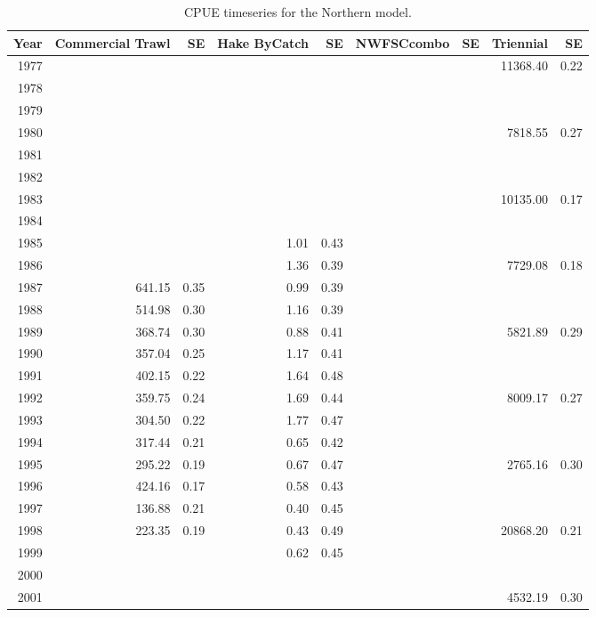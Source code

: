 \documentclass[12pt,]{article}
\begin{document}
\newpage

\begin{table}[ht]
\centering
\caption{CPUE timeseries for the Northern model.} 
\label{tab:Northern_CPUE}
\begin{tabular}{rrrrrrrrr}
  \hline
Year & Commercial Trawl & SE & Hake ByCatch & SE & NWFSCcombo & SE & Triennial & SE \\ 
  \hline
1977 &  &  &  &  &  &  & 11368.40 & 0.22 \\ 
  1978 &  &  &  &  &  &  &  &  \\ 
  1979 &  &  &  &  &  &  &  &  \\ 
  1980 &  &  &  &  &  &  & 7818.55 & 0.27 \\ 
  1981 &  &  &  &  &  &  &  &  \\ 
  1982 &  &  &  &  &  &  &  &  \\ 
  1983 &  &  &  &  &  &  & 10135.00 & 0.17 \\ 
  1984 &  &  &  &  &  &  &  &  \\ 
  1985 &  &  & 1.01 & 0.43 &  &  &  &  \\ 
  1986 &  &  & 1.36 & 0.39 &  &  & 7729.08 & 0.18 \\ 
  1987 & 641.15 & 0.35 & 0.99 & 0.39 &  &  &  &  \\ 
  1988 & 514.98 & 0.30 & 1.16 & 0.39 &  &  &  &  \\ 
  1989 & 368.74 & 0.30 & 0.88 & 0.41 &  &  & 5821.89 & 0.29 \\ 
  1990 & 357.04 & 0.25 & 1.17 & 0.41 &  &  &  &  \\ 
  1991 & 402.15 & 0.22 & 1.64 & 0.48 &  &  &  &  \\ 
  1992 & 359.75 & 0.24 & 1.69 & 0.44 &  &  & 8009.17 & 0.27 \\ 
  1993 & 304.50 & 0.22 & 1.77 & 0.47 &  &  &  &  \\ 
  1994 & 317.44 & 0.21 & 0.65 & 0.42 &  &  &  &  \\ 
  1995 & 295.22 & 0.19 & 0.67 & 0.47 &  &  & 2765.16 & 0.30 \\ 
  1996 & 424.16 & 0.17 & 0.58 & 0.43 &  &  &  &  \\ 
  1997 & 136.88 & 0.21 & 0.40 & 0.45 &  &  &  &  \\ 
  1998 & 223.35 & 0.19 & 0.43 & 0.49 &  &  & 20868.20 & 0.21 \\ 
  1999 &  &  & 0.62 & 0.45 &  &  &  &  \\ 
  2000 &  &  &  &  &  &  &  &  \\ 
  2001 &  &  &  &  &  &  & 4532.19 & 0.30 \\ 

\end{tabular}
\end{table}
\end{document}
